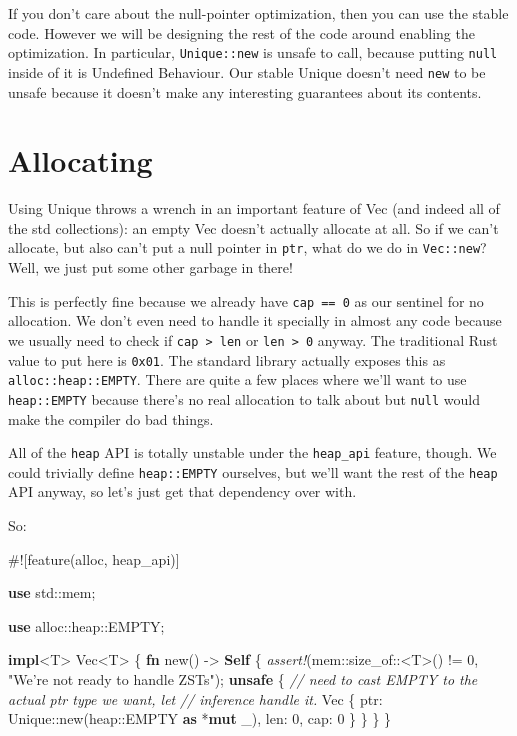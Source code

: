 \documentclass[a4paper,]{book}
\newenvironment{Shaded}{\begin{snugshade}}{\end{snugshade}}
\newcommand{\KeywordTok}[1]{\textcolor[rgb]{0.13,0.29,0.53}{\textbf{{#1}}}}
\newcommand{\DataTypeTok}[1]{\textcolor[rgb]{0.13,0.29,0.53}{{#1}}}
\newcommand{\DecValTok}[1]{\textcolor[rgb]{0.00,0.00,0.81}{{#1}}}
\newcommand{\StringTok}[1]{\textcolor[rgb]{0.31,0.60,0.02}{{#1}}}
\newcommand{\CommentTok}[1]{\textcolor[rgb]{0.56,0.35,0.01}{\textit{{#1}}}}
\newcommand{\PreprocessorTok}[1]{\textcolor[rgb]{0.56,0.35,0.01}{\textit{{#1}}}}
\newcommand{\AttributeTok}[1]{\textcolor[rgb]{0.77,0.63,0.00}{{#1}}}
\newcommand{\NormalTok}[1]{{#1}}
\begin{document}
If you don't care about the null-pointer optimization, then you can use
the stable code. However we will be designing the rest of the code
around enabling the optimization. In particular, \texttt{Unique::new} is
unsafe to call, because putting \texttt{null} inside of it is Undefined
Behaviour. Our stable Unique doesn't need \texttt{new} to be unsafe
because it doesn't make any interesting guarantees about its contents.

\section{Allocating}\label{sec--vec-alloc}

Using Unique throws a wrench in an important feature of Vec (and indeed
all of the std collections): an empty Vec doesn't actually allocate at
all. So if we can't allocate, but also can't put a null pointer in
\texttt{ptr}, what do we do in \texttt{Vec::new}? Well, we just put some
other garbage in there!

This is perfectly fine because we already have \texttt{cap\ ==\ 0} as
our sentinel for no allocation. We don't even need to handle it
specially in almost any code because we usually need to check if
\texttt{cap\ \textgreater{}\ len} or \texttt{len\ \textgreater{}\ 0}
anyway. The traditional Rust value to put here is \texttt{0x01}. The
standard library actually exposes this as \texttt{alloc::heap::EMPTY}.
There are quite a few places where we'll want to use
\texttt{heap::EMPTY} because there's no real allocation to talk about
but \texttt{null} would make the compiler do bad things.

All of the \texttt{heap} API is totally unstable under the
\texttt{heap\_api} feature, though. We could trivially define
\texttt{heap::EMPTY} ourselves, but we'll want the rest of the
\texttt{heap} API anyway, so let's just get that dependency over with.

So:

\begin{Shaded}
\begin{Highlighting}[]
\AttributeTok{#![}\NormalTok{feature}\AttributeTok{(}\NormalTok{alloc}\AttributeTok{,} \NormalTok{heap_api}\AttributeTok{)]}

\KeywordTok{use} \NormalTok{std::mem;}

\KeywordTok{use} \NormalTok{alloc::heap::EMPTY;}

\KeywordTok{impl}\NormalTok{<T> }\DataTypeTok{Vec}\NormalTok{<T> \{}
    \KeywordTok{fn} \NormalTok{new() -> }\KeywordTok{Self} \NormalTok{\{}
        \PreprocessorTok{assert!}\NormalTok{(mem::size_of::<T>() != }\DecValTok{0}\NormalTok{, }\StringTok{"We're not ready to handle ZSTs"}\NormalTok{);}
        \KeywordTok{unsafe} \NormalTok{\{}
            \CommentTok{// need to cast EMPTY to the actual ptr type we want, let}
            \CommentTok{// inference handle it.}
            \DataTypeTok{Vec} \NormalTok{\{ ptr: Unique::new(heap::EMPTY }\KeywordTok{as} \NormalTok{*}\KeywordTok{mut} \NormalTok{_), len: }\DecValTok{0}\NormalTok{, cap: }\DecValTok{0} \NormalTok{\}}
        \NormalTok{\}}
    \NormalTok{\}}
\NormalTok{\}}
\end{Highlighting}
\end{Shaded}
\end{document}
